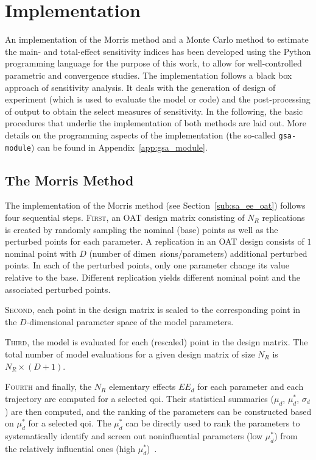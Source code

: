 \section{Implementation}\label{sec:sa_implementation}

An implementation of the Morris method and a Monte Carlo method to estimate the main- and total-effect sensitivity indices has been developed using the Python \cite{PCT2017} programming language 
for the purpose of this work, to allow for well-controlled parametric and convergence studies.
The implementation follows a black box approach of sensitivity analysis. 
It deals with the generation of design of experiment (which is used to evaluate the model or code) and the post-processing of output to obtain the select measures of sensitivity.
In the following, the basic procedures that underlie the implementation of both methods are laid out.
More details on the programming aspects of the implementation (the so-called \texttt{gsa-module}) can be found in Appendix~\ref{app:gsa_module}.

\subsection{The Morris Method}\label{sub:sa_morris}

The implementation of the Morris method (see Section~\ref{sub:sa_ee_oat}) follows four sequential steps. 
\textsc{First}, an OAT design matrix consisting of $N_R$ replications is created by randomly sampling the nominal (base) points as well as the perturbed points for each parameter.
A replication in an OAT design consists of $1$ nominal point with $D$ (number of dimen~sions/parameters) additional perturbed points.
In each of the perturbed points, only one parameter change its value relative to the base.
Different replication yields different nominal point and the associated perturbed points.

\textsc{Second}, each point in the design matrix is scaled to the corresponding point in the $D$-dimensional parameter space of the model parameters.

\textsc{Third}, the model is evaluated for each (rescaled) point in the design matrix. The total number of model evaluations for a given design matrix of size $N_R$ is $N_R \times (D + 1)$.

\textsc{Fourth} and finally, the $N_R$ elementary effects $EE_d$ for each parameter and each trajectory are computed for a selected \gls{qoi}.
Their statistical summaries ($\mu_d$, $\mu_d^*$, $\sigma_d$) are then computed, 
and the ranking of the parameters can be constructed based on $\mu_d^*$ for a selected \gls{qoi}.
The $\mu_d^*$ can be directly used to rank the parameters to systematically identify 
and screen out noninfluential parameters (low $\mu_d^*$) from the relatively influential ones (high $\mu_d^*$)~\cite{Campolongo2007}.

